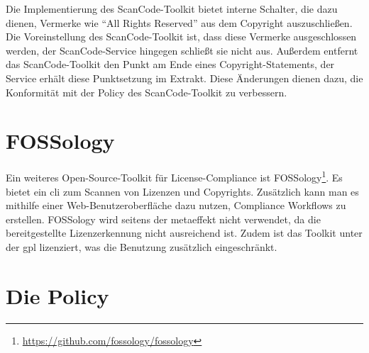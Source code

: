 Die Implementierung des ScanCode-Toolkit bietet interne Schalter, die dazu dienen, Vermerke wie \enquote{All Rights Reserved} aus dem Copyright auszuschließen.
Die Voreinstellung des ScanCode-Toolkit ist, dass diese Vermerke ausgeschlossen werden, der ScanCode-Service hingegen schließt sie nicht aus.
Außerdem entfernt das ScanCode-Toolkit den Punkt am Ende eines Copyright-Statements, der Service erhält diese Punktsetzung im Extrakt.
Diese Änderungen dienen dazu, die Konformität mit der Policy des ScanCode-Toolkit zu verbessern\autocite{noauthor_metaeffekt-scancode-service_2025}.


\section{FOSSology}\label{sec:fossology}

Ein weiteres Open-Source-Toolkit für License-Compliance ist FOSSology\footnote{\url{https://github.com/fossology/fossology}}.
Es bietet ein \gls{cli} zum Scannen von Lizenzen und Copyrights.
Zusätzlich kann man es mithilfe einer Web-Benutzeroberfläche dazu nutzen, Compliance Workflows zu erstellen.
FOSSology wird seitens der metaeffekt nicht verwendet, da die bereitgestellte Lizenzerkennung nicht ausreichend ist.
Zudem ist das Toolkit unter der \gls{gpl} lizenziert, was die Benutzung zusätzlich eingeschränkt.


\section{Die Policy}\label{sec:policy}

